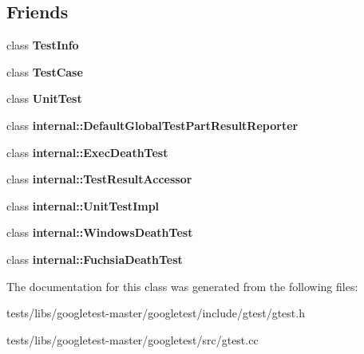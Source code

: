 \subsection*{Friends}
\begin{DoxyCompactItemize}
\item 
\mbox{\label{classtesting_1_1TestResult_a4c49c2cdb6c328e6b709b4542f23de3c}} 
class {\bfseries Test\+Info}
\item 
\mbox{\label{classtesting_1_1TestResult_aff779e55b06adfa7c0088bd10253f0f0}} 
class {\bfseries Test\+Case}
\item 
\mbox{\label{classtesting_1_1TestResult_a832b4d233efee1a32feb0f4190b30d39}} 
class {\bfseries Unit\+Test}
\item 
\mbox{\label{classtesting_1_1TestResult_abae39633da9932847b41cb80efd62115}} 
class {\bfseries internal\+::\+Default\+Global\+Test\+Part\+Result\+Reporter}
\item 
\mbox{\label{classtesting_1_1TestResult_adf5553cae6aea6f8648d47e299237e34}} 
class {\bfseries internal\+::\+Exec\+Death\+Test}
\item 
\mbox{\label{classtesting_1_1TestResult_ae762da04e74a0d3b0daded3c5bd4a8e8}} 
class {\bfseries internal\+::\+Test\+Result\+Accessor}
\item 
\mbox{\label{classtesting_1_1TestResult_acc0a5e7573fd6ae7ad1878613bb86853}} 
class {\bfseries internal\+::\+Unit\+Test\+Impl}
\item 
\mbox{\label{classtesting_1_1TestResult_a6aeedc04a0590fcc1b3c5f687dbb0f9f}} 
class {\bfseries internal\+::\+Windows\+Death\+Test}
\item 
\mbox{\label{classtesting_1_1TestResult_af29d5921f68031cdfba0b28cf4b3b559}} 
class {\bfseries internal\+::\+Fuchsia\+Death\+Test}
\end{DoxyCompactItemize}


The documentation for this class was generated from the following files\+:\begin{DoxyCompactItemize}
\item 
tests/libs/googletest-\/master/googletest/include/gtest/gtest.\+h\item 
tests/libs/googletest-\/master/googletest/src/gtest.\+cc\end{DoxyCompactItemize}
